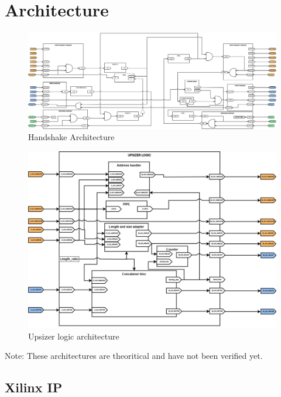 \section{Architecture}

\begin{figure}[H]
    \centering
    \includegraphics[width=\linewidth]{images/architecture_handshacke.png}
    \caption{Handshake Architecture}
\end{figure}

\begin{figure}[H]
    \centering
    \includegraphics[width=\linewidth]{images/upsizer_logiquee.png}
    \caption{Upsizer logic architecture}
    \label{fig:enter-label}
\end{figure}

\color{red}Note: These architectures are theoritical and have not been verified yet.\color{black}

\subsection{Xilinx IP}

